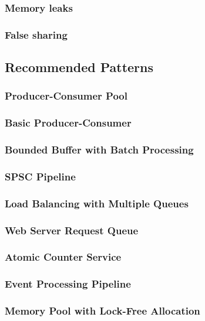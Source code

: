 \documentclass[12pt, letterpaper]{article}
\begin{document}
	\subsubsection{Memory leaks}
	\subsubsection{False sharing}
	\subsection{Recommended Patterns}
	\subsubsection{Producer-Consumer Pool}
	\subsubsection{Basic Producer-Consumer}
	\subsubsection{Bounded Buffer with Batch Processing}
	\subsubsection{SPSC Pipeline}
	\subsubsection{Load Balancing with Multiple Queues}
	\subsubsection{Web Server Request Queue}
	\subsubsection{Atomic Counter Service}
	\subsubsection{Event Processing Pipeline}
	\subsubsection{Memory Pool with Lock-Free Allocation}
	
	
\end{document}
